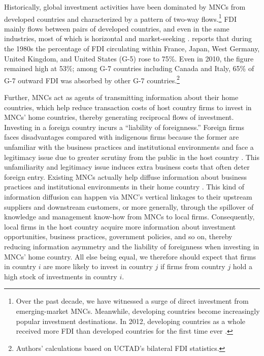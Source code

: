 \documentclass[reqno,onecolumn,letterpaper,12pt]{article}
\begin{document}
Historically, global investment activities have been dominated by MNCs from developed countries and characterized by a pattern of two-way flows.\footnote{Over the past decade, we have witnessed a surge of direct investment from emerging-market MNCs. Meanwhile, developing countries become increasingly popular investment destinations. In 2012, developing countries as a whole received more FDI than developed countries for the first time ever \citep{UNCTAD:2013}.} FDI mainly flows between pairs of developed countries, and even in the same industries, most of which is horizontal and market-seeking \citep[171]{Markusen:1995}. \citet[~22]{Julius:1990} reports that during the 1980s the percentage of FDI circulating within France, Japan, West Germany, United Kingdom, and United States (G-5) rose to 75\%. Even in 2010, the figure remained high at 53\%; among G-7 countries including Canada and Italy, 65\% of G-7 outward FDI was absorbed by other G-7 countries.\footnote{Authors' calculations based on UCTAD's bilateral FDI statistics.}

Further, MNCs act as agents of transmitting information about their home countries, which help reduce transaction costs of host country firms to invest in MNCs' home countries, thereby generating reciprocal flows of investment. Investing in a foreign country incurs a ``liability of foreignness.'' Foreign firms faces disadvantages compared with indigenous firms because the former are unfamiliar with the business practices and institutional environments and face a legitimacy issue due to greater scrutiny from the public in the host country \citep{Zaheer:1995,Kostova_Zaheer:1999,Hymer:1976}. This unfamiliarity and legitimacy issue induces extra business costs that often deter foreign entry. Existing MNCs actually help diffuse information about business practices and institutional environments in their home country \citep{Kwok_Tadesse:2006,Sandholtz_Gray:2003}. This kind of information diffusion can happen via MNC's vertical linkages to their upstream suppliers and downstream customers, or more generally, through the spillover of knowledge and management know-how from MNCs to local firms. Consequently, local firms in the host country acquire more information about investment opportunities, business practices, government policies, and so on, thereby reducing information asymmetry and the liability of foreignness when investing in MNCs' home country. All else being equal, we therefore should expect that firms in country $i$ are more likely to invest in country $j$ if firms from country $j$ hold a high stock of investments in country $i$.
\end{document}
